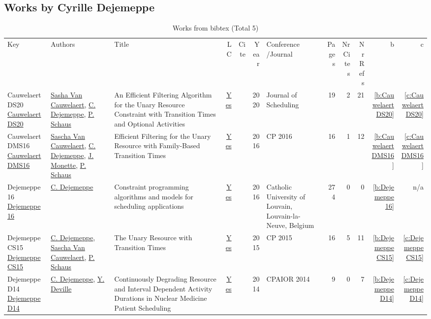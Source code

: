 \subsection{Works by Cyrille Dejemeppe}
\label{sec:a208}
{\scriptsize
\begin{longtable}{>{\raggedright\arraybackslash}p{3cm}>{\raggedright\arraybackslash}p{6cm}>{\raggedright\arraybackslash}p{6.5cm}rrrp{2.5cm}rrrrr}
\rowcolor{white}\caption{Works from bibtex (Total 5)}\\ \toprule
\rowcolor{white}Key & Authors & Title & LC & Cite & Year & \shortstack{Conference\\/Journal} & Pages & \shortstack{Nr\\Cites} & \shortstack{Nr\\Refs} & b & c \\ \midrule\endhead
\bottomrule
\endfoot
CauwelaertDS20 \href{http://dx.doi.org/10.1007/s10951-019-00632-8}{CauwelaertDS20} & \hyperref[auth:a848]{Sasha Van Cauwelaert}, \hyperref[auth:a208]{C. Dejemeppe}, \hyperref[auth:a148]{P. Schaus} & An Efficient Filtering Algorithm for the Unary Resource Constraint with Transition Times and Optional Activities & \href{works/CauwelaertDS20.pdf}{Yes} & \cite{CauwelaertDS20} & 2020 & Journal of Scheduling & 19 & 2 & 21 & \ref{b:CauwelaertDS20} & \ref{c:CauwelaertDS20}\\
CauwelaertDMS16 \href{https://doi.org/10.1007/978-3-319-44953-1\_33}{CauwelaertDMS16} & \hyperref[auth:a207]{Sascha Van Cauwelaert}, \hyperref[auth:a208]{C. Dejemeppe}, \hyperref[auth:a150]{J. Monette}, \hyperref[auth:a148]{P. Schaus} & Efficient Filtering for the Unary Resource with Family-Based Transition Times & \href{works/CauwelaertDMS16.pdf}{Yes} & \cite{CauwelaertDMS16} & 2016 & CP 2016 & 16 & 1 & 12 & \ref{b:CauwelaertDMS16} & \ref{c:CauwelaertDMS16}\\
Dejemeppe16 \href{https://hdl.handle.net/2078.1/178078}{Dejemeppe16} & \hyperref[auth:a208]{C. Dejemeppe} & Constraint programming algorithms and models for scheduling applications & \href{works/Dejemeppe16.pdf}{Yes} & \cite{Dejemeppe16} & 2016 & Catholic University of Louvain, Louvain-la-Neuve, Belgium & 274 & 0 & 0 & \ref{b:Dejemeppe16} & n/a\\
DejemeppeCS15 \href{https://doi.org/10.1007/978-3-319-23219-5\_7}{DejemeppeCS15} & \hyperref[auth:a208]{C. Dejemeppe}, \hyperref[auth:a207]{Sascha Van Cauwelaert}, \hyperref[auth:a148]{P. Schaus} & The Unary Resource with Transition Times & \href{works/DejemeppeCS15.pdf}{Yes} & \cite{DejemeppeCS15} & 2015 & CP 2015 & 16 & 5 & 11 & \ref{b:DejemeppeCS15} & \ref{c:DejemeppeCS15}\\
DejemeppeD14 \href{https://doi.org/10.1007/978-3-319-07046-9\_20}{DejemeppeD14} & \hyperref[auth:a208]{C. Dejemeppe}, \hyperref[auth:a152]{Y. Deville} & Continuously Degrading Resource and Interval Dependent Activity Durations in Nuclear Medicine Patient Scheduling & \href{works/DejemeppeD14.pdf}{Yes} & \cite{DejemeppeD14} & 2014 & CPAIOR 2014 & 9 & 0 & 7 & \ref{b:DejemeppeD14} & \ref{c:DejemeppeD14}\\
\end{longtable}
}

